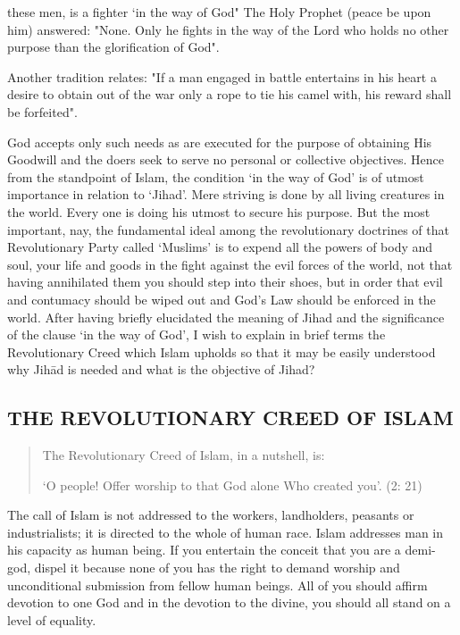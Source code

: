 these men, is a fighter `in the way of God" The Holy Prophet (peace be
upon him) answered: "None. Only he fights in the way of the Lord who
holds no other purpose than the glorification of God".

Another tradition relates: "If a man engaged in battle entertains in his
heart a desire to obtain out of the war only a rope to tie his camel
with, his reward shall be forfeited".

God accepts only such needs as are executed for the purpose of obtaining
His Goodwill and the doers seek to serve no personal or collective
objectives. Hence from the standpoint of Islam, the condition `in the
way of God' is of utmost importance in relation to `Jihad'. Mere
striving is done by all living creatures in the world. Every one is
doing his utmost to secure his purpose. But the most important, nay, the
fundamental ideal among the revolutionary doctrines of that
Revolutionary Party called `Muslims' is to expend all the powers of body
and soul, your life and goods in the fight against the evil forces of
the world, not that having annihilated them you should step into their
shoes, but in order that evil and contumacy should be wiped out and
God's Law should be enforced in the world. After having briefly
elucidated the meaning of Jihad and the significance of the clause `in
the way of God', I wish to explain in brief terms the Revolutionary
Creed which Islam upholds so that it may be easily understood why Jihād
is needed and what is the objective of Jihad?

\hypertarget{the-revolutionary-creed-of-islam}{%
\subsection{THE REVOLUTIONARY CREED OF
ISLAM}\label{the-revolutionary-creed-of-islam}}

\begin{quote}
The Revolutionary Creed of Islam, in a nutshell, is:

`O people! Offer worship to that God alone Who created you'. (2: 21)
\end{quote}

The call of Islam is not addressed to the workers, landholders, peasants
or industrialists; it is directed to the whole of human race. Islam
addresses man in his capacity as human being. If you entertain the
conceit that you are a demi-god, dispel it because none of you has the
right to demand worship and unconditional submission from fellow human
beings. All of you should affirm devotion to one God and in the devotion
to the divine, you should all stand on a level of equality.

